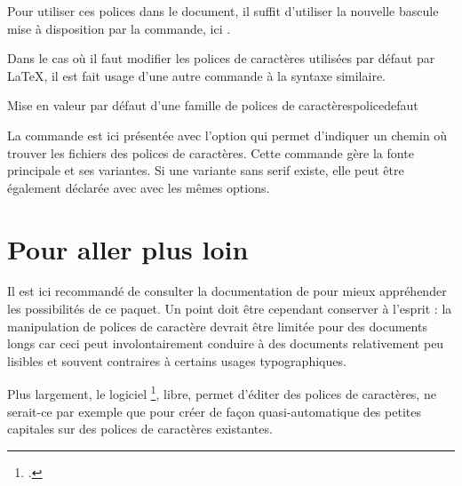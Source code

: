 Pour utiliser ces polices dans le document, il suffit d'utiliser la nouvelle bascule mise à disposition par la commande, ici . 

Dans le cas où il faut modifier les polices de caractères utilisées par défaut par \LaTeX, il est fait usage d'une autre  commande à la syntaxe similaire.

\begin{codesimple}{Mise en valeur par défaut d'une famille de polices de caractères}{policedefaut}
\setmainfont[Path=fontes/,
 BoldFont = §oc policegrasse.ttf §fc,
 ItalicFont = §oc policeitalique.ttf §fc,
 BoldItalicFont = §oc policeitaliquegrasse.ttf §fc
 ]{§oc policenormale.ttf §fc}
\end{codesimple}

La commande est ici présentée avec l'option  qui permet d'indiquer un chemin où trouver les fichiers des polices de caractères. Cette commande gère la fonte principale et ses variantes. Si une variante sans serif existe, elle peut être également déclarée avec  avec les mêmes options.

\section{Pour aller plus loin}

Il est ici recommandé de consulter la documentation de  pour mieux appréhender les possibilités de ce paquet. Un point doit être cependant conserver à l'esprit : la manipulation de polices de caractère devrait être limitée pour des documents longs car ceci peut involontairement conduire à des documents relativement peu lisibles et souvent contraires à certains usages typographiques.

Plus largement, le logiciel \footnote{.}, libre, permet d'éditer des polices de caractères, ne serait-ce par exemple que pour créer de façon quasi-automatique des petites capitales sur des polices de caractères existantes.